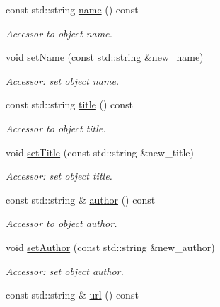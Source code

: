 \begin{DoxyCompactItemize}
const std::string \hyperlink{class_d_d4hep_1_1_geometry_1_1_header_a56f8ff7aee494b00bb948dbc2cf55275}{name} () const 
\begin{DoxyCompactList}\small\item\em Accessor to object name. \item\end{DoxyCompactList}\item 
void \hyperlink{class_d_d4hep_1_1_geometry_1_1_header_ae65f0f1c5b9f6c5697d0831a19b4056c}{setName} (const std::string \&new\_\-name)
\begin{DoxyCompactList}\small\item\em Accessor: set object name. \item\end{DoxyCompactList}\item 
const std::string \hyperlink{class_d_d4hep_1_1_geometry_1_1_header_a4b1cd787d7ed06dd85a7627b15ea1a59}{title} () const 
\begin{DoxyCompactList}\small\item\em Accessor to object title. \item\end{DoxyCompactList}\item 
void \hyperlink{class_d_d4hep_1_1_geometry_1_1_header_a5e718143f204d4c58721e145772b896c}{setTitle} (const std::string \&new\_\-title)
\begin{DoxyCompactList}\small\item\em Accessor: set object title. \item\end{DoxyCompactList}\item 
const std::string \& \hyperlink{class_d_d4hep_1_1_geometry_1_1_header_a6fdee88e5082f7951371f0ae19398f9d}{author} () const 
\begin{DoxyCompactList}\small\item\em Accessor to object author. \item\end{DoxyCompactList}\item 
void \hyperlink{class_d_d4hep_1_1_geometry_1_1_header_a7efa4948ea5e1a980bc15a88522f7618}{setAuthor} (const std::string \&new\_\-author)
\begin{DoxyCompactList}\small\item\em Accessor: set object author. \item\end{DoxyCompactList}\item 
const std::string \& \hyperlink{class_d_d4hep_1_1_geometry_1_1_header_a83256db8c7c5257820e73828ecc41d00}{url} () const 

\end{DoxyCompactItemize}

